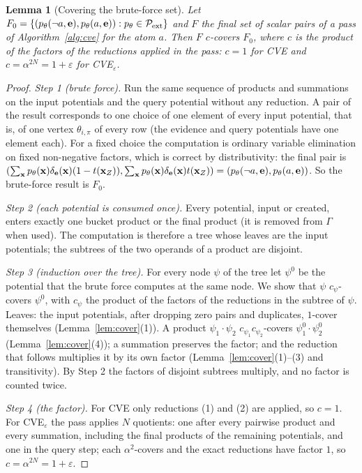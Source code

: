 \documentclass{article} %
\newtheorem{lemma}{Lemma}
\begin{document}
\begin{lemma}[Covering the brute-force set]\label{lem:cve-induction}
Let $F_0=\{(p_\theta(\neg a,\mathbf{e}),p_\theta(a,\mathbf{e})) : p_\theta\in\mathcal P_{\mathrm{ext}}\}$ and
$F$ the final set of scalar pairs of a pass of Algorithm~\ref{alg:cve} for the atom $a$.
Then $F$ $c$-covers $F_0$, where $c$ is the product of the factors of the reductions applied
in the pass: $c=1$ for CVE and $c=\alpha^{2N}=1+\varepsilon$ for CVE$_\varepsilon$.
\end{lemma}

\begin{proof}
\emph{Step 1 (brute force).} Run the same sequence of products and summations on the input
potentials and the query potential without any reduction. A pair of the result corresponds
to one choice of one element of every input potential, that is, of one vertex
$\theta_{i,\pi}$ of every row (the evidence and query potentials have one element each). For
a fixed choice the computation is ordinary variable elimination on fixed non-negative
factors, which is correct by distributivity: the final pair is
$(\sum_{\mathbf x}p_\theta(\mathbf x)\delta_{\mathbf{e}}(\mathbf x)(1-t(\mathbf x_Z)),
\sum_{\mathbf x}p_\theta(\mathbf x)\delta_{\mathbf{e}}(\mathbf x)t(\mathbf x_Z))=
(p_\theta(\neg a,\mathbf{e}),p_\theta(a,\mathbf{e}))$. So the brute-force result is $F_0$.

\emph{Step 2 (each potential is consumed once).} Every potential, input or created, enters
exactly one bucket product or the final product (it is removed from $\Gamma$ when used). The
computation is therefore a tree whose leaves are the input potentials; the subtrees of the
two operands of a product are disjoint.

\emph{Step 3 (induction over the tree).} For every node $\psi$ of the tree let $\psi^0$ be the
potential that the brute force computes at the same node. We show that $\psi$
$c_\psi$-covers $\psi^0$, with $c_\psi$ the product of the factors of the reductions in the
subtree of $\psi$. Leaves: the input potentials, after dropping zero pairs and duplicates,
$1$-cover themselves (Lemma~\ref{lem:cover}(1)). A product $\psi_1\cdot\psi_2$
$c_{\psi_1}c_{\psi_2}$-covers $\psi_1^0\cdot\psi_2^0$ (Lemma~\ref{lem:cover}(4)); a summation
preserves the factor; and the reduction that follows multiplies it by its own factor
(Lemma~\ref{lem:cover}(1)--(3) and transitivity). By Step 2 the factors of disjoint subtrees
multiply, and no factor is counted twice.

\emph{Step 4 (the factor).} For CVE only reductions (1) and (2) are applied, so $c=1$. For
CVE$_\varepsilon$ the pass applies $N$ quotients: one after every pairwise product and every
summation, including the final products of the remaining potentials, and one in the query
step; each $\alpha^2$-covers and the exact reductions have factor $1$, so
$c=\alpha^{2N}=1+\varepsilon$.
\end{proof}
\end{document}
